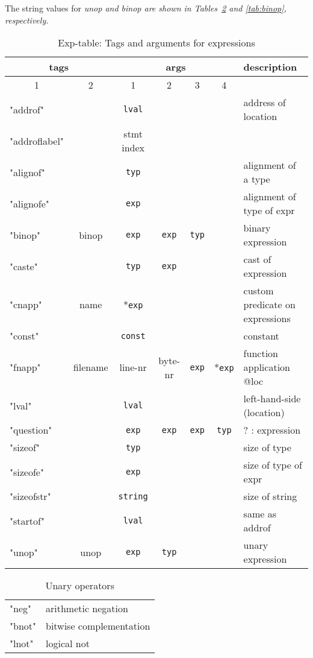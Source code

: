 \documentclass[11pt]{article}
\begin{document}
The string values for \em{unop} and \em{binop} are shown
in Tables~\ref{tab:unop} and \ref{tab:binop}, respectively.
\begin{table}
\centering
\begin{tabular}{l|c||c|c|c|c||l}
\multicolumn{2}{c||}{tags} & \multicolumn{4}{|c||}{args} & description \\ \hline
\multicolumn{1}{c|}{1} & 2 & 1 & 2 & 3 & 4 & \\ \hline 
"addrof" & & {\tt lval} & & & & address of location \\
"addroflabel" & & stmt index & & & \\
"alignof" & & {\tt typ} & & & & alignment of a type \\
"alignofe" & & {\tt exp} & & & & alignment of type of expr \\
"binop" & binop & {\tt exp} & {\tt exp} & {\tt typ} & & binary expression \\
"caste" & & {\tt typ} & {\tt exp} & & & cast of expression \\
"cnapp" & name & *{\tt exp} & & & & custom predicate on expressions \\
"const" & & {\tt const} & & & & constant \\
"fnapp" & filename & line-nr & byte-nr & {\tt exp} & *{\tt exp} & function application @loc \\
"lval" & & {\tt lval} & & & & left-hand-side (location) \\
"question" & & {\tt exp} & {\tt exp} & {\tt exp} & {\tt typ} & ? : expression \\
"sizeof" & & {\tt typ} & & & & size of type \\
"sizeofe" & & {\tt exp} & & & & size of type of expr \\
"sizeofstr" & & {\tt string} & & & & size of string\\
"startof" & & {\tt lval} & & & & same as addrof \\
"unop" & unop & {\tt exp} & {\tt typ} & & & unary expression \\ \hline
\end{tabular}
\caption{\label{tab:exptable}Exp-table: Tags and arguments for expressions}
\end{table}



\begin{table}[t]
\centering
\begin{tabular}{l|l} \hline
"neg" & arithmetic negation \\
"bnot" & bitwise complementation \\
"lnot" & logical not  \\ \hline
\end{tabular}
\caption{\label{tab:unop}Unary operators}
\end{table}
\end{document}
